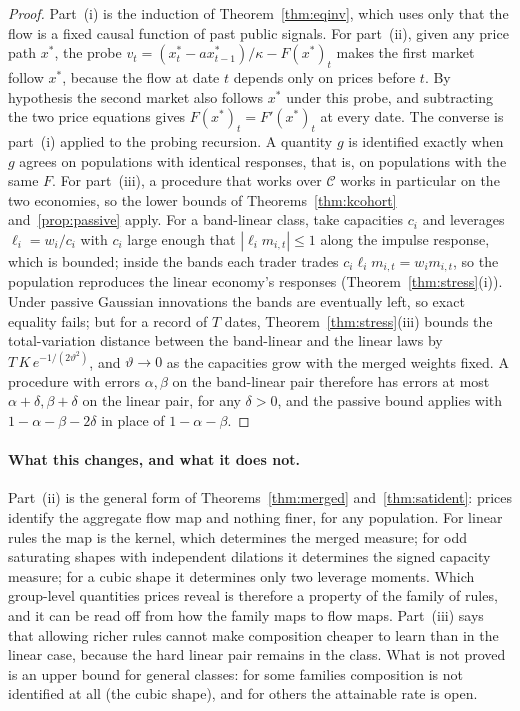 \begin{proof}
Part~(i) is the induction of Theorem~\ref{thm:eqinv}, which uses only that the flow is a fixed causal function of past public signals. For part~(ii), given any price path $x^*$, the probe $v_t=(x^*_t-ax^*_{t-1})/\kappa-F(x^*)_t$ makes the first market follow $x^*$, because the flow at date $t$ depends only on prices before $t$. By hypothesis the second market also follows $x^*$ under this probe, and subtracting the two price equations gives $F(x^*)_t=F'(x^*)_t$ at every date. The converse is part~(i) applied to the probing recursion. A quantity $g$ is identified exactly when $g$ agrees on populations with identical responses, that is, on populations with the same $F$. For part~(iii), a procedure that works over $\mathcal C$ works in particular on the two economies, so the lower bounds of Theorems~\ref{thm:kcohort} and~\ref{prop:passive} apply. For a band-linear class, take capacities $c_i$ and leverages $\ell_i=w_i/c_i$ with $c_i$ large enough that $|\ell_im_{i,t}|\le1$ along the impulse response, which is bounded; inside the bands each trader trades $c_i\ell_im_{i,t}=w_im_{i,t}$, so the population reproduces the linear economy's responses (Theorem~\ref{thm:stress}(i)). Under passive Gaussian innovations the bands are eventually left, so exact equality fails; but for a record of $T$ dates, Theorem~\ref{thm:stress}(iii) bounds the total-variation distance between the band-linear and the linear laws by $T\,K\,e^{-1/(2\vartheta^2)}$, and $\vartheta\to0$ as the capacities grow with the merged weights fixed. A procedure with errors $\alpha,\beta$ on the band-linear pair therefore has errors at most $\alpha+\delta,\beta+\delta$ on the linear pair, for any $\delta>0$, and the passive bound applies with $1-\alpha-\beta-2\delta$ in place of $1-\alpha-\beta$.
\end{proof}

\paragraph{What this changes, and what it does not.} Part~(ii) is the general form of Theorems~\ref{thm:merged} and~\ref{thm:satident}: prices identify the aggregate flow map and nothing finer, for any population. For linear rules the map is the kernel, which determines the merged measure; for odd saturating shapes with independent dilations it determines the signed capacity measure; for a cubic shape it determines only two leverage moments. Which group-level quantities prices reveal is therefore a property of the family of rules, and it can be read off from how the family maps to flow maps. Part~(iii) says that allowing richer rules cannot make composition cheaper to learn than in the linear case, because the hard linear pair remains in the class. What is not proved is an upper bound for general classes: for some families composition is not identified at all (the cubic shape), and for others the attainable rate is open.

